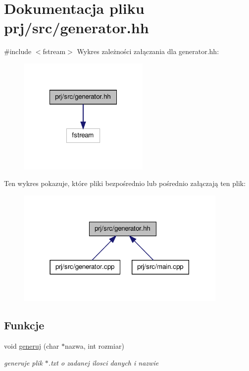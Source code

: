\hypertarget{generator_8hh}{\section{\-Dokumentacja pliku prj/src/generator.hh}
\label{generator_8hh}
}
{\ttfamily \#include $<$fstream$>$}\*
\-Wykres zależności załączania dla generator.\-hh\-:\nopagebreak
\begin{figure}[H]
\begin{center}
\leavevmode
\includegraphics[width=180pt]{generator_8hh__incl}
\end{center}
\end{figure}
\-Ten wykres pokazuje, które pliki bezpośrednio lub pośrednio załączają ten plik\-:\nopagebreak
\begin{figure}[H]
\begin{center}
\leavevmode
\includegraphics[width=290pt]{generator_8hh__dep__incl}
\end{center}
\end{figure}
\subsection*{\-Funkcje}
\begin{DoxyCompactItemize}
\item 
void \hyperlink{generator_8hh_a8a338f908bb9996d5b01aab4439e8a56}{generuj} (char $\ast$nazwa, int rozmiar)
\begin{DoxyCompactList}\small\item\em generuje plik $\ast$.txt o zadanej ilosci danych i nazwie \end{DoxyCompactList}\end{DoxyCompactItemize}


